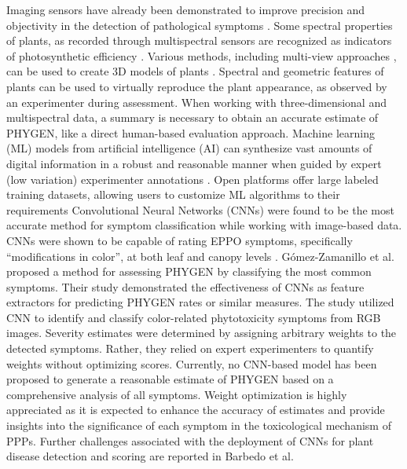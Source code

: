 \documentclass[12pt,a4paper,oneside]{report}
\begin{document}
Imaging sensors have already been demonstrated to improve precision and objectivity in the detection of pathological symptoms 
\cite{chiangUnderstandingRamificationsQuantitative2022,mahleinPlantDiseaseDetection2016}.
Some spectral properties of plants, as recorded through multispectral sensors \cite{mahleinHyperspectralSensorsImaging2018}
are recognized as indicators of photosynthetic efficiency \cite{gatesSpectralPropertiesPlants1965,carterLeafOpticalProperties2001}.
Various methods, including multi-view approaches
\cite{rossiPerformancesEvaluationLowCost2020,li3DImagingGreenhouse2017,zhouEvaluatingGeometricMeasurement2018},
can be used to create 3D models of plants \cite{mahleinPlantDiseaseDetection2016}.
Spectral and geometric features of plants can be used to virtually reproduce the plant appearance, as observed by an experimenter during assessment. When working with three-dimensional and multispectral data, a summary is necessary to obtain an accurate estimate of PHYGEN, like a direct human-based evaluation approach. Machine learning (ML) models from artificial intelligence (AI) can synthesize vast amounts of digital information in a robust and reasonable manner when guided by expert (low variation) experimenter annotations
\cite{mahleinHyperspectralSensorsImaging2018}.
Open platforms offer large labeled training datasets, allowing users to customize ML algorithms to their requirements
\cite{hughesOpenAccessRepository,hajamEffectiveEnsembleConvolutional2023}
Convolutional Neural Networks (CNNs) were found to be the most accurate method for symptom classification 
\cite{tanTomatoLeafDiseases2021,nikithLeafDiseaseDetection2023}
while working with image-based data. CNNs were shown to be capable of rating EPPO symptoms, specifically “modifications in color”, at both leaf and canopy levels
\cite{ghosalExplainableDeepMachine2018}.
Gómez-Zamanillo et al. \cite{gomez-zamanilloDamageAssessmentSoybean2023}
proposed a method for assessing PHYGEN by classifying the most common symptoms. Their study demonstrated the effectiveness of CNNs as feature extractors for predicting PHYGEN rates or similar measures. The study utilized CNN to identify and classify color-related phytotoxicity symptoms from RGB images. Severity estimates were determined by assigning arbitrary weights to the detected symptoms. Rather, they relied on expert experimenters to quantify weights without optimizing scores. Currently, no CNN-based model has been proposed to generate a reasonable estimate of PHYGEN based on a comprehensive analysis of all symptoms. Weight optimization is highly appreciated as it is expected to enhance the accuracy of estimates and provide insights into the significance of each symptom in the toxicological mechanism of PPPs. Further challenges associated with the deployment of CNNs for plant disease detection and scoring are reported in Barbedo et al.
\end{document}
